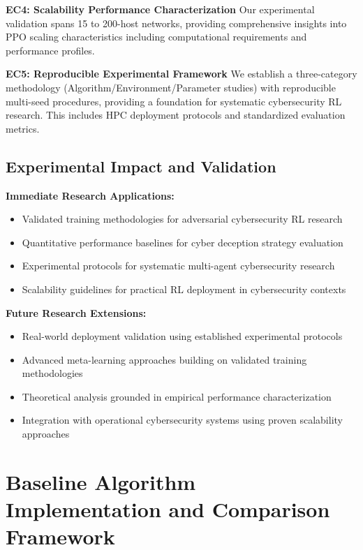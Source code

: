 \documentclass[12pt,oneside]{article}
\begin{document}
\textbf{EC4: Scalability Performance Characterization}
Our experimental validation spans 15 to 200-host networks, providing comprehensive insights into PPO scaling characteristics including computational requirements and performance profiles.

\textbf{EC5: Reproducible Experimental Framework}
We establish a three-category methodology (Algorithm/Environment/Parameter studies) with reproducible multi-seed procedures, providing a foundation for systematic cybersecurity RL research. This includes HPC deployment protocols and standardized evaluation metrics.

\subsection{Experimental Impact and Validation}

\textbf{Immediate Research Applications:}
\begin{itemize}
\item Validated training methodologies for adversarial cybersecurity RL research
\item Quantitative performance baselines for cyber deception strategy evaluation  
\item Experimental protocols for systematic multi-agent cybersecurity research
\item Scalability guidelines for practical RL deployment in cybersecurity contexts
\end{itemize}

\textbf{Future Research Extensions:}
\begin{itemize}
\item Real-world deployment validation using established experimental protocols
\item Advanced meta-learning approaches building on validated training methodologies
\item Theoretical analysis grounded in empirical performance characterization
\item Integration with operational cybersecurity systems using proven scalability approaches
\end{itemize}

\section{Baseline Algorithm Implementation and Comparison Framework}
\end{document}
